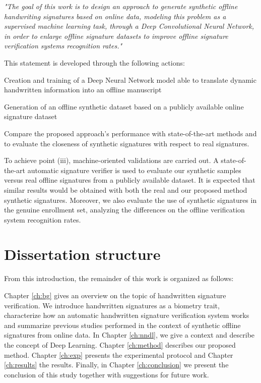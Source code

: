 \textit{"The goal of this work is to design an approach to generate synthetic offline handwriting signatures based on online data, modeling this problem as a supervised machine learning task, through a Deep Convolutional Neural Network, in order to enlarge offline signature datasets to improve offline signature verification systems recognition rates."}

This statement is developed through the following actions:
\begin{inlinelist}
\item Creation and training of a Deep Neural Network model able to translate dynamic handwritten information into an offline manuscript
\item Generation of an offline synthetic dataset based on a publicly available online signature dataset
\item Compare the proposed approach’s performance with state-of-the-art methods and to evaluate the closeness of synthetic signatures with respect to real signatures. 
\end{inlinelist}

To achieve point (iii), machine-oriented validations are carried out. A state-of-the-art automatic signature verifier is used to evaluate our synthetic samples versus real offline signatures from a publicly available dataset. It is expected that similar results would be obtained with both the real and our proposed method synthetic signatures. Moreover, we also evaluate the use of synthetic signatures in the genuine enrollment set, analyzing the differences on the offline verification system recognition rates. 

\section{Dissertation structure}
From this introduction, the remainder of this work is organized as follows:

Chapter \ref{ch:bg} gives an overview on the topic of handwritten signature verification. We introduce handwritten signatures as a biometry trait, characterize how an automatic handwritten signature verification system works and summarize previous studies performed in the context of synthetic offline signatures from online data. In Chapter \ref{ch:nndl}, we give a context and describe the concept of Deep Learning. Chapter \ref{ch:method} describes our proposed method. Chapter \ref{ch:exp} presents the experimental protocol and Chapter \ref{ch:results} the results. Finally, in Chapter \ref{ch:conclusion} we present the conclusion of this study together with suggestions for future work.



